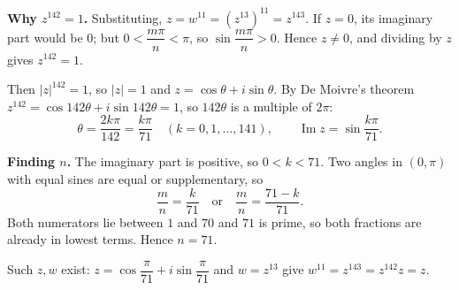 \textbf{Why $z^{142}=1$.} Substituting, $z=w^{11}=\left(z^{13}\right)^{11}=z^{143}$. If $z=0$, its imaginary part would be $0$; but $0<\dfrac{m\pi}{n}<\pi$, so $\sin\dfrac{m\pi}{n}>0$. Hence $z\ne0$, and dividing by $z$ gives $z^{142}=1$.

Then $|z|^{142}=1$, so $|z|=1$ and $z=\cos\theta+i\sin\theta$. By De Moivre's theorem $z^{142}=\cos142\theta+i\sin142\theta=1$, so $142\theta$ is a multiple of $2\pi$:
\[
\theta=\dfrac{2k\pi}{142}=\dfrac{k\pi}{71}\quad(k=0,1,\dots,141),\qquad \operatorname{Im}z=\sin\dfrac{k\pi}{71}.
\]

\textbf{Finding $n$.} The imaginary part is positive, so $0<k<71$. Two angles in $(0,\pi)$ with equal sines are equal or supplementary, so
\[
\dfrac {m}{n}=\dfrac{k}{71}\quad\text{or}\quad\dfrac {m}{n}=\dfrac{71-k}{71}.
\]
Both numerators lie between $1$ and $70$ and $71$ is prime, so both fractions are already in lowest terms. Hence $n=\boxed{71}$.

Such $z,w$ exist: $z=\cos\dfrac{\pi}{71}+i\sin\dfrac{\pi}{71}$ and $w=z^{13}$ give $w^{11}=z^{143}=z^{142}z=z$.
